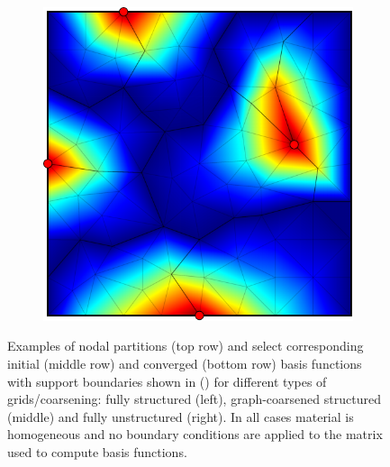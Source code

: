 \begin{figure}[htbp]
\begin{subfigure}[t]{0.3\textwidth}
  \end{subfigure}
  \hfill
  \begin{subfigure}[t]{0.3\textwidth}
    \centerline{\includegraphics[width=0.9\linewidth]{figs/square/square_tria_metis_node_conv}}
  \end{subfigure}
  \caption[Nodal partitions and basis function examples]{\label{fig:square_node_basis} Examples of nodal partitions (top row) and select corresponding initial (middle row) and converged (bottom row) basis functions with support boundaries shown in () for different types of grids/coarsening: fully structured (left), graph-coarsened structured (middle) and fully unstructured (right).   In all cases material is homogeneous and no boundary conditions are applied to the matrix used to compute basis functions.}
\end{figure}

